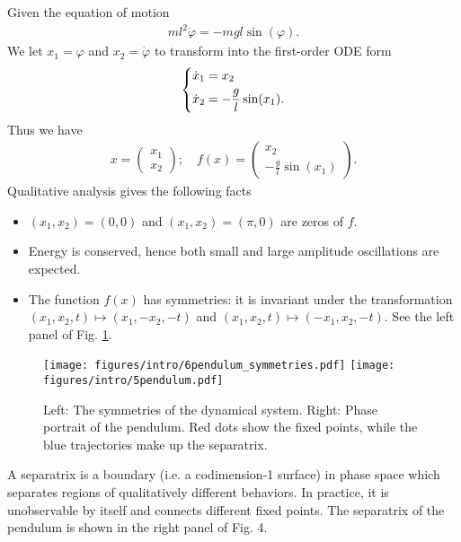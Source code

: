 \begin{ex}[Pendulum]
Given the equation of motion
\begin{align}
	ml^2 \ddot{\varphi} = -mgl \sin(\varphi).
\end{align}
We let $ x_1 = \varphi$ and $ {x}_2 =\dot{\varphi}$ to transform into the first-order ODE form
\begin{align}
	\begin{dcases}
	\dot{x}_1 = x_2 \\
\dot{x}_2 = - \frac{g}{l} \sin (x_1).
	\end{dcases}
\end{align}
Thus we have 
\begin{align}
 {x} = 
\begin{pmatrix}
	x_1 \\ x_2
\end{pmatrix}; \quad
f( {x}) = 
\begin{pmatrix}
	x_2 \\ - \frac{g}{l}\sin(x_1)	
\end{pmatrix}.
\end{align}
Qualitative analysis gives the following facts
\begin{itemize}
	\item $(x_1, x_2) = (0,0)$ and $(x_1, x_2) = (\pi , 0)$ are zeros of $f$.
	\item Energy is conserved, hence both small and large amplitude oscillations are expected.
	\item The function $f(x)$ has symmetries: it is invariant under the transformation $(x_1, x_2, t) \mapsto (x_1, -x_2, -t)$ and $(x_1, x_2, t) \mapsto (-x_1, x_2, -t)$. See the left panel of Fig. \ref{fig:pendulum_symm+traj}.
\end{itemize}
\begin{figure}[h!]
	\centering
	\texttt{[image: figures/intro/6pendulum\_symmetries.pdf]}
	\texttt{[image: figures/intro/5pendulum.pdf]}
	\caption{Left: The symmetries of the dynamical system. Right: Phase portrait of the pendulum. Red dots show the fixed points, while the blue trajectories make up the separatrix.} \label{fig:pendulum_symm+traj}
\end{figure}
\begin{definition}
	A separatrix is a boundary (i.e. a codimension-1 surface) in phase space which separates regions of qualitatively different behaviors. In practice, it is unobservable by itself and connects different fixed points. The separatrix of the pendulum is shown in the right panel of Fig. 4.
\end{definition}

\end{ex}

